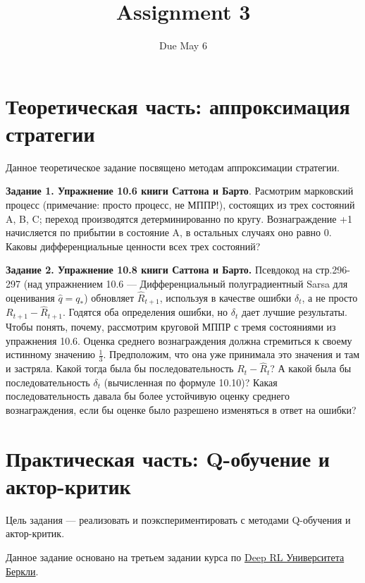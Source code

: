 \documentclass[12pt, oneside]{article}
\author{Due May 6}
\title{Assignment 3}
\date{}
\begin{document}
\maketitle
\thispagestyle{fancy}

\section{Теоретическая часть: аппроксимация стратегии}

Данное теоретическое задание посвящено методам аппроксимации стратегии.


\textbf{Задание 1. Упражнение 10.6 книги Саттона и Барто}. Расмотрим марковский процесс (примечание: просто процесс, не МППР!), состоящих из трех состояний A, B, C; переход производятся детерминированно по кругу. Вознаграждение +1 начисляется по прибытии в состояние A, в остальных случаях оно равно 0. Каковы дифференциальные ценности всех трех состояний?

\textbf{Задание 2. Упражнение 10.8 книги Саттона и Барто.} Псевдокод на стр.296-297 (над упражнением 10.6 --- Дифференциальный полуградиентный Sarsa для оценивания $\hat{q} = q_*$) обновляет $\hat{R}_{t+1}$, используя в качестве ошибки $\delta_t$, а не просто $R_{t+1} - \hat{R}_{t+1}$. Годятся оба определения ошибки, но $\delta_t$ дает лучшие результаты. Чтобы понять, почему, рассмотрим круговой МППР с тремя состояниями из упражнения 10.6. Оценка среднего вознаграждения должна стремиться к своему истинному значению $\frac{1}{3}$. Предположим, что она уже принимала это значения и там и застряла. Какой тогда была бы последовательность $R_t - \hat{R}_t$? А какой была бы последовательность $\delta_t$ (вычисленная по формуле 10.10)? Какая последовательность давала бы более устойчивую оценку среднего вознаграждения, если бы оценке было разрешено изменяться в ответ на ошибки?

\section{Практическая часть: Q-обучение и актор-критик}

Цель задания --- реализовать и поэкспериментировать с методами Q-обучения и актор-критик.

Данное задание основано на третьем задании курса по \href{http://rail.eecs.berkeley.edu/deeprlcourse/}{Deep RL Университета Беркли}.
\end{document}
